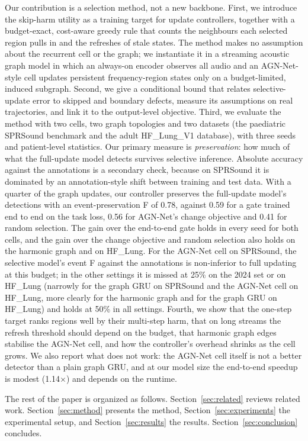 Our contribution is a selection method, not a new backbone. First, we introduce the skip-harm utility as a training target for update controllers, together with a budget-exact, cost-aware greedy rule that counts the neighbours each selected region pulls in and the refreshes of stale states. The method makes no assumption about the recurrent cell or the graph; we instantiate it in a streaming acoustic graph model in which an always-on encoder observes all audio and an AGN-Net-style cell updates persistent frequency-region states only on a budget-limited, induced subgraph. Second, we give a conditional bound that relates selective-update error to skipped and boundary defects, measure its assumptions on real trajectories, and link it to the output-level objective. Third, we evaluate the method with two cells, two graph topologies and two datasets (the paediatric SPRSound benchmark and the adult HF\_Lung\_V1 database), with three seeds and patient-level statistics. Our primary measure is \emph{preservation}: how much of what the full-update model detects survives selective inference. Absolute accuracy against the annotations is a secondary check, because on SPRSound it is dominated by an annotation-style shift between training and test data. With a quarter of the graph updates, our controller preserves the full-update model's detections with an event-preservation F of 0.78, against 0.59 for a gate trained end to end on the task loss, 0.56 for AGN-Net's change objective and 0.41 for random selection. The gain over the end-to-end gate holds in every seed for both cells, and the gain over the change objective and random selection also holds on the harmonic graph and on HF\_Lung. For the AGN-Net cell on SPRSound, the selective model's event F against the annotations is non-inferior to full updating at this budget; in the other settings it is missed at 25\% on the 2024 set or on HF\_Lung (narrowly for the graph GRU on SPRSound and the AGN-Net cell on HF\_Lung, more clearly for the harmonic graph and for the graph GRU on HF\_Lung) and holds at 50\% in all settings. Fourth, we show that the one-step target ranks regions well by their multi-step harm, that on long streams the refresh threshold should depend on the budget, that harmonic graph edges stabilise the AGN-Net cell, and how the controller's overhead shrinks as the cell grows. We also report what does not work: the AGN-Net cell itself is not a better detector than a plain graph GRU, and at our model size the end-to-end speedup is modest (1.14$\times$) and depends on the runtime.

The rest of the paper is organized as follows. Section~\ref{sec:related} reviews related work. Section~\ref{sec:method} presents the method, Section~\ref{sec:experiments} the experimental setup, and Section~\ref{sec:results} the results. Section~\ref{sec:conclusion} concludes.
